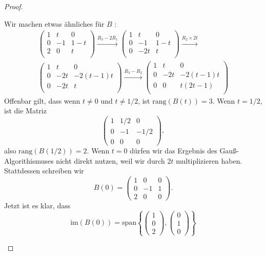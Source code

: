\begin{proof}
\begin{parts}
Wir machen etwas ähnliches für $B$ :
\begin{gather*}
	\left(
\begin{array}{ccc}
 1 & t & 0 \\
 0 & -1 & 1-t \\
 2 & 0 & t \\
\end{array}
\right) \xrightarrow{R_3-2R_1} \left(
\begin{array}{ccc}
 1 & t & 0 \\
 0 & -1 & 1-t \\
 0 & -2 t & t \\
\end{array}
\right) \xrightarrow{R_2\times 2 t}\\ \left(
\begin{array}{ccc}
 1 & t & 0 \\
 0 & -2 t & -2 (t-1) t \\
 0 & -2 t & t \\
\end{array}
\right) \xrightarrow{R_3-R_2} \left(
\begin{array}{ccc}
 1 & t & 0 \\
 0 & -2 t & -2 (t-1) t \\
 0 & 0 & t (2 t-1) \\
\end{array}
\right) 
\end{gather*}
Offenbar gilt, dass wenn $t\neq 0$ und $t\neq 1 / 2$, ist $\text{rang}(B(t))=3$. Wenn $t= 1 /2$, ist die Matriz
\[
	\begin{pmatrix}  1 & 1 / 2 & 0 \\ 0 & -1 & -1 / 2 \\ 0 & 0 & 0 \end{pmatrix} 
,\] 
also $\text{rang}(B(1 / 2))=2$. Wenn $t=0$ dürfen wir das Ergebnis des Gauß-Algorithismuses nicht direkt nutzen, weil wir durch $2t$ multiplizieren haben. Stattdessen schreiben wir
\[
	B(0)=\begin{pmatrix} 1 & 0 & 0 \\ 0 & -1 & 1\\ 2 & 0 & 0 \end{pmatrix} 
.\] 
Jetzt ist es klar, dass
\[
	\text{im}(B(0))=\text{span}\left\{ \begin{pmatrix} 1 \\ 0 \\ 2 \end{pmatrix} , \begin{pmatrix}  0 \\ 1 \\ 0\end{pmatrix}  \right\} 
\]
\end{parts}
\end{proof}
